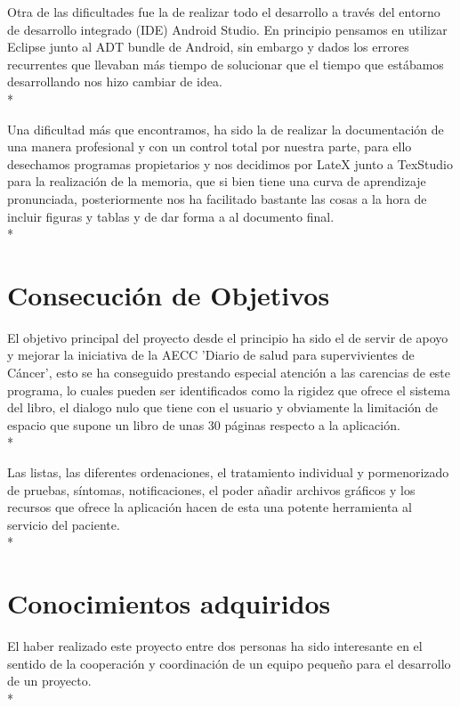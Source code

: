 \documentclass[../pfc.tex]{subfiles}
\begin{document}
	Otra de las dificultades fue la de realizar todo el desarrollo a través del entorno de desarrollo integrado (IDE) Android Studio. En principio pensamos en utilizar Eclipse junto al ADT bundle de Android, sin embargo y dados los errores recurrentes que llevaban más tiempo de solucionar que el tiempo que estábamos desarrollando nos hizo cambiar de idea.\\*
	 
	Una dificultad más que encontramos, ha sido la de realizar la documentación de una manera profesional y con un control total por nuestra parte, para ello desechamos programas propietarios y nos decidimos por LateX\cite{sharelatex} junto a TexStudio\cite{texstudio} para la realización de la memoria, que si bien tiene una curva de aprendizaje pronunciada, posteriormente nos ha facilitado bastante las cosas a la hora de incluir figuras y tablas y de dar forma a al documento final.\\*
	
		
	\section{Consecución de Objetivos}
	
	El objetivo principal del proyecto desde el principio ha sido el de servir de apoyo y mejorar la iniciativa de la AECC 'Diario de salud para supervivientes de Cáncer', esto se ha conseguido prestando especial atención a las carencias de este programa, lo cuales pueden ser identificados como la rigidez que ofrece el sistema del libro, el dialogo nulo que tiene con el usuario y obviamente la limitación de espacio que supone un libro de unas 30 páginas respecto a la aplicación.\\*
	
	Las listas, las diferentes ordenaciones, el tratamiento individual y pormenorizado de pruebas, síntomas, notificaciones, el poder añadir archivos gráficos y los recursos que ofrece la aplicación hacen de esta una potente herramienta al servicio del paciente.\\*
		
	
	\section{Conocimientos adquiridos}
	
	El haber realizado este proyecto entre dos personas ha sido interesante en el sentido de la cooperación y coordinación de un equipo pequeño para el desarrollo de un proyecto.\\*
	
\end{document}
